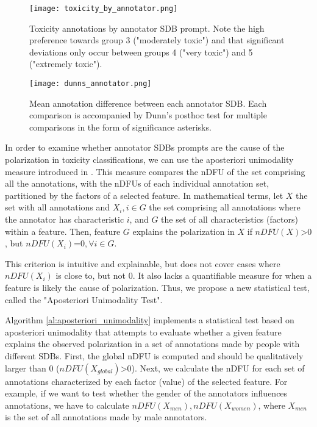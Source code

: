 \begin{figure}
	\centering
	\texttt{[image: toxicity\_by\_annotator.png]}
	\caption{Toxicity annotations by annotator \ac{SDB} prompt. Note the high preference towards group 3 ("moderately toxic") and that significant deviations only occur between groups 4 ("very toxic") and 5 ("extremely toxic").}
	\label{fig::toxicity-annotator}
\end{figure}

\begin{figure}
	\centering
	\texttt{[image: dunns\_annotator.png]}
	\caption{Mean annotation difference between each annotator \ac{SDB}. Each comparison is accompanied by Dunn's posthoc test for multiple comparisons in the form of significance asterisks.}
	\label{fig::toxicity-annotator-significance}
\end{figure}


In order to examine whether annotator \acp{SDB} prompts are the cause of the polarization in toxicity classifications, we can use the aposteriori unimodality measure introduced in \citet{pavlopoulos-likas-2024-polarized}. This measure compares the \ac{nDFU} of the set comprising all the annotations, with the \acp{nDFU} of each individual annotation set, partitioned by the factors of a selected feature. In mathematical terms, let $X$ the set with all annotations and $X_i, i \in G$ the set comprising all annotations where the annotator has characteristic $i$, and $G$ the set of all characteristics (factors) within a feature. Then, feature $G$ explains the polarization in $X$ if $nDFU(X) \text{>} 0$, but $nDFU(X_i) \text{=} 0, \forall i \in G$. 

This criterion is intuitive and explainable, but does not cover cases where $nDFU(X_i)$ is close to, but not $0$. It also lacks a quantifiable measure for when a feature is likely the cause of polarization. Thus, we propose a new statistical test, called the "Aposteriori Unimodality Test". 

Algorithm \ref{al:aposteriori_unimodality} implements a statistical test based on aposteriori unimodality that attempts to evaluate whether a given feature explains the observed polarization in a set of annotations made by people with different \acp{SDB}. First, the global \ac{nDFU} is computed and should be qualitatively larger than $0$ ($nDFU(X_{global}) \text{>} 0$). Next, we calculate the \ac{nDFU} for each set of annotations characterized by each factor (value) of the selected feature. For example, if we want to test whether the gender of the annotators influences annotations, we have to calculate $nDFU(X_{men}), nDFU(X_{women})$, where $X_{men}$ is the set of all annotations made by male annotators. 

